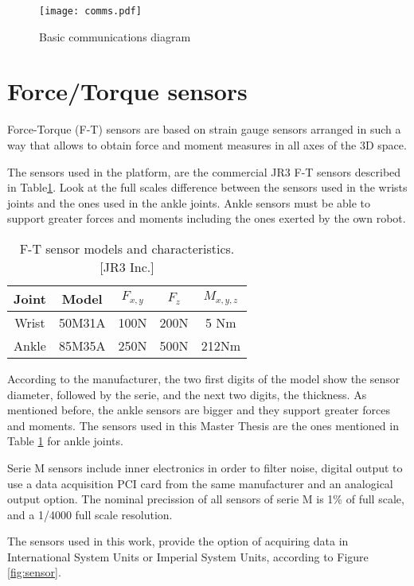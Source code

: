 \begin{figure}[!hbt]
\centering
\texttt{[image: comms.pdf]}
\caption{Basic communications diagram}
\label{fig:comms}
\end{figure}

\section{Force/Torque sensors}
Force-Torque (F-T) sensors are based on strain gauge sensors arranged in such a way that allows to obtain force and moment measures in all axes of the 3D space. 

The sensors used in the platform, are the commercial JR3 F-T sensors described in Table\ref{table:sensores}. Look at the full scales difference between the sensors used in the wrists joints and the ones used in the ankle joints. Ankle sensors must be able to support greater forces and moments including the ones exerted by the own robot.

\begin{table}[!hbt]
\centering
\begin{tabular}{|c|c|c|c|c|}
\hline
Joint & Model & $F_{x,y}$ & $F_z$ & $M_{x,y,z}$\\
\hline
Wrist & 50M31A & 100N & 200N & 5 Nm\\ 
\hline
Ankle & 85M35A & 250N & 500N & 212Nm\\
\hline
\end{tabular}
\caption{F-T sensor models and characteristics. [JR3 Inc.]}
\label{table:sensores}
\end{table}

According to the manufacturer, the two first digits of the model show the sensor diameter, followed by the serie, and the next two digits, the thickness. As mentioned before, the ankle sensors are bigger and they support greater forces and moments. The sensors used in this Master Thesis are the ones mentioned in Table \ref{table:sensores} for ankle joints.

Serie M sensors include inner electronics in order to filter noise, digital output to use a data acquisition PCI card from the same manufacturer and an analogical output option. The nominal precission of all sensors of serie M is 1\% of full scale, and a 1/4000 full scale resolution.

The sensors used in this work, provide the option of acquiring data in International System Units or Imperial System Units, according to Figure \ref{fig:sensor}.

